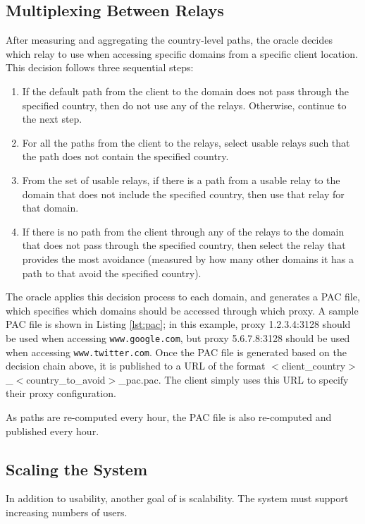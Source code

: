 \subsection{Multiplexing Between Relays}
\label{multiplex}
After measuring and aggregating the country-level paths, the oracle decides 
which relay to use when accessing specific domains from a specific client 
location.  This decision follows three sequential steps:

\begin{enumerate}
\item If the default path from the client to the domain does not pass through 
the specified country, then do not use any of the relays. Otherwise, continue 
to the next step.
\item For all the paths from the client to the relays, select usable relays 
such that the path does not contain the specified country.
\item From the set of usable relays, if there is a path from a 
usable relay to the domain that does not include the specified country, then 
use that relay for that domain.
\item If there is no path from the client through any of the relays to the domain 
that does not pass through the specified country, then select the relay 
that provides the most avoidance (measured by how many other domains it has 
a path to that avoid the specified country).
\end{enumerate}

The oracle applies this decision process to each domain, and generates a PAC 
file, which specifies which domains should be accessed through which proxy.  A 
sample PAC file is shown in Listing \ref{lst:pac}; in this example, proxy 
1.2.3.4:3128 should be used when accessing {\tt www.google.com}, but proxy 
5.6.7.8:3128 should be used when accessing {\tt www.twitter.com}.  Once the PAC 
file is generated based on the decision chain above, it is published to a URL 
of the format $<$client\_country$>$\_$<$country\_to\_avoid$>$\_pac.pac.  The client 
simply uses this URL to specify their proxy configuration.



As paths are re-computed every hour, the PAC file is also re-computed and 
published every hour.

\subsection{Scaling the System}
In addition to usability, another goal of \system{} is scalability.  The system 
must support increasing numbers of users.  

